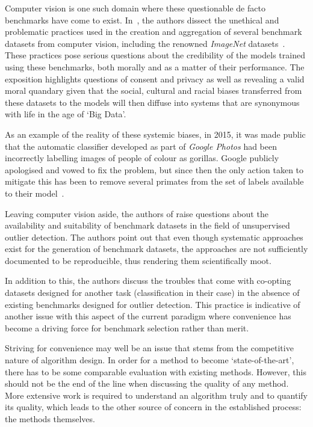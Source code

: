 Computer vision is one such domain where these questionable de facto benchmarks
have come to exist. In~\cite{Prabhu2020}, the authors dissect the unethical and
problematic practices used in the creation and aggregation of several benchmark
datasets from computer vision, including the renowned \emph{ImageNet}
datasets~\cite{Deng2009}. These practices pose serious questions about the
credibility of the models trained using these benchmarks, both morally and as a
matter of their performance. The exposition highlights questions of consent and
privacy as well as revealing a valid moral quandary given that the social,
cultural and racial biases transferred from these datasets to the models will
then diffuse into systems that are synonymous with life in the age of `Big
Data'.

As an example of the reality of these systemic biases, in 2015, it was made
public that the automatic classifier developed as part of \emph{Google Photos}
had been incorrectly labelling images of people of colour as gorillas. Google
publicly apologised and vowed to fix the problem, but since then the only action
taken to mitigate this has been to remove several primates from the set of
labels available to their model~\cite{Simonite2018}.

Leaving computer vision aside, the authors of \cite{Campos2016} raise questions
about the availability and suitability of benchmark datasets in the field of
unsupervised outlier detection. The authors point out that even though
systematic approaches exist for the generation of benchmark datasets, the
approaches are not sufficiently documented to be reproducible, thus rendering
them scientifically moot.

In addition to this, the authors discuss the troubles that come with co-opting
datasets designed for another task (classification in their case) in the absence
of existing benchmarks designed for outlier detection. This practice is
indicative of another issue with this aspect of the current paradigm where
convenience has become a driving force for benchmark selection rather than
merit.

Striving for convenience may well be an issue that stems from the competitive
nature of algorithm design. In order for a method to become `state-of-the-art',
there has to be some comparable evaluation with existing methods. However, this
should not be the end of the line when discussing the quality of any method.
More extensive work is required to understand an algorithm truly and to quantify
its quality, which leads to the other source of concern in the established
process: the methods themselves.

